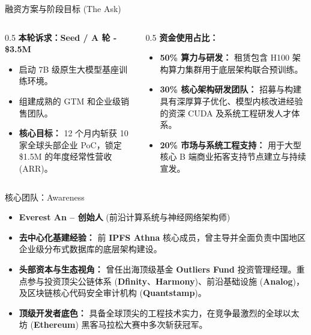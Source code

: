 ﻿\documentclass[aspectratio=169, 10pt]{beamer}
\begin{document}
\begin{frame}{融资方案与阶段目标 (The Ask)}
\begin{columns}
\begin{column}{0.5\textwidth}
\textbf{本轮诉求：Seed / A 轮 - \$3.5M}
\vspace{0.5em}
\begin{itemize}
    \item 启动 7B 级原生大模型基座训练环境。
    \item 组建成熟的 GTM 和企业级销售团队。
    \item \textbf{核心目标：} 12 个月内斩获 10 家全球头部企业 PoC，锁定 \$1.5M 的年度经常性营收 (ARR)。
\end{itemize}
\end{column}
\begin{column}{0.5\textwidth}
\textbf{资金使用占比：}
\begin{itemize}
    \item \textbf{50\% 算力与研发：} 租赁包含 H100 架构算力集群用于底层架构联合预训练。
    \item \textbf{30\% 核心架构研发团队：} 招募与构建具有深厚算子优化、模型内核改进经验的资深 CUDA 及系统工程研发人才体系。
    \item \textbf{20\% 市场与系统工程支持：} 用于大型核心 B 端商业拓客支持节点建立与持续宣发。
\end{itemize}
\end{column}
\end{columns}
\end{frame}

\begin{frame}{核心团队：Awareness}
\begin{itemize}
    \item \textbf{Everest An -- 创始人} (前沿计算系统与神经网络架构师)
    \vspace{0.5em}
    \item \textbf{去中心化基建经验：} 前 \textbf{IPFS Athna} 核心成员，曾主导并全面负责中国地区企业级分布式数据库的底层架构建设。
    \item \textbf{头部资本与生态视角：} 曾任出海顶级基金 \textbf{Outliers Fund} 投资管理经理。重点参与投资顶尖公链体系 (\textbf{Dfinity}、\textbf{Harmony})、前沿基础设施 (\textbf{Analog})，及区块链核心代码安全审计机构 (\textbf{Quantstamp})。
    \item \textbf{顶级开发者底色：} 具备全球顶尖的工程技术实力，在竞争最激烈的全球以太坊 (\textbf{Ethereum}) 黑客马拉松大赛中多次斩获冠军。
\end{itemize}
\end{frame}
\end{document}
